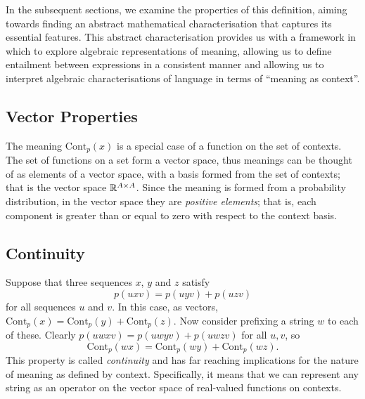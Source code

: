 \documentclass[12pt]{report}
\newcommand{\Cont}{\mathrm{Cont}}
\begin{document}
In the subsequent sections, we examine the properties of this definition, aiming towards finding an abstract mathematical characterisation that captures its essential features. This abstract characterisation provides us with a framework in which to explore algebraic representations of meaning, allowing us to define entailment between expressions in a consistent manner and allowing us to interpret algebraic characterisations of language in terms of ``meaning as context''.

\subsection{Vector Properties}

The meaning $\Cont_p(x)$ is a special case of a function on the set of contexts. The set of functions on a set form a vector space, thus meanings can be thought of as elements of a vector space, with a basis formed from the set of contexts; that is the vector space $\mathbb{R}^{A\times A}$. Since the meaning is formed from a probability distribution, in the vector space they are \emph{positive elements}; that is, each component is greater than or equal to zero with respect to the context basis.

\subsection{Continuity}

Suppose that three sequences $x$, $y$ and $z$ satisfy
$$p(uxv) = p(uyv) + p(uzv)$$
for all sequences $u$ and $v$. In this case, as vectors, $\Cont_p(x) = \Cont_p(y) + \Cont_p(z)$. Now consider prefixing a string $w$ to each of these. Clearly $p(uwxv) = p(uwyv) + p(uwzv)$ for all $u,v$, so
$$\Cont_p(wx) = \Cont_p(wy) + \Cont_p(wz).$$
This property is called \emph{continuity} and has far reaching implications for the nature of meaning as defined by context. Specifically, it means that we can represent any string as an operator on the vector space of real-valued functions on contexts.


\end{document}
